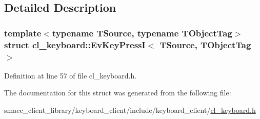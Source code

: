 \subsection{Detailed Description}
\subsubsection*{template$<$typename T\+Source, typename T\+Object\+Tag$>$\newline
struct cl\+\_\+keyboard\+::\+Ev\+Key\+Press\+I$<$ T\+Source, T\+Object\+Tag $>$}



Definition at line 57 of file cl\+\_\+keyboard.\+h.



The documentation for this struct was generated from the following file\+:\begin{DoxyCompactItemize}
\item 
smacc\+\_\+client\+\_\+library/keyboard\+\_\+client/include/keyboard\+\_\+client/\hyperlink{cl__keyboard_8h}{cl\+\_\+keyboard.\+h}\end{DoxyCompactItemize}
